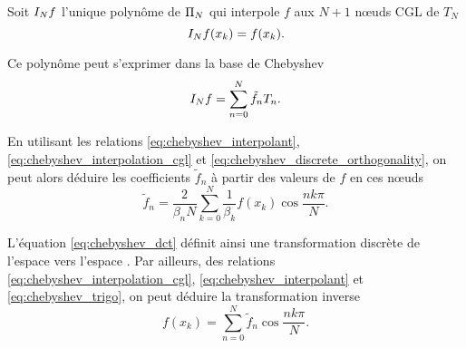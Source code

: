 Soit $\interpolant{f}{N}$ l'unique polynôme de $\polyspace{N}$ qui interpole $f$ aux $N+1$ n\oe uds CGL de $T_N$
\begin{equation}
	\interpolant{f}{N}(x_k) = f(x_k).
	\label{eq:chebyshev_interpolation_cgl}
\end{equation}

Ce polynôme peut s'exprimer dans la base de Chebyshev
\begin{equation}
	\interpolant{f}{N} = \sum_{n=0}^{N} \tilde{f}_n T_n.
	\label{eq:chebyshev_interpolant}
\end{equation}

En utilisant les relations \eqref{eq:chebyshev_interpolant}, \eqref{eq:chebyshev_interpolation_cgl} et \eqref{eq:chebyshev_discrete_orthogonality}, on peut alors déduire les coefficients $\tilde{f}_n$ à partir des valeurs de $f$ en ces n\oe uds%
\begin{equation}
	\tilde{f}_n = \frac{2}{\beta_n N} \sum_{k=0}^{N} \frac{1}{\beta_k} f(x_k) \cos \frac{n k \pi}{N}.
	\label{eq:chebyshev_dct}
\end{equation}

L'équation \eqref{eq:chebyshev_dct} définit ainsi une transformation discrète de l'espace  vers l'espace . 
Par ailleurs, des relations \eqref{eq:chebyshev_interpolation_cgl}, \eqref{eq:chebyshev_interpolant} et \eqref{eq:chebyshev_trigo}, on peut déduire la transformation inverse
\begin{equation}
	f(x_k) = \sum_{n=0}^{N} \tilde{f}_n \cos \frac{n k \pi}{N}.
	\label{eq:chebyshev_idct}
\end{equation}

